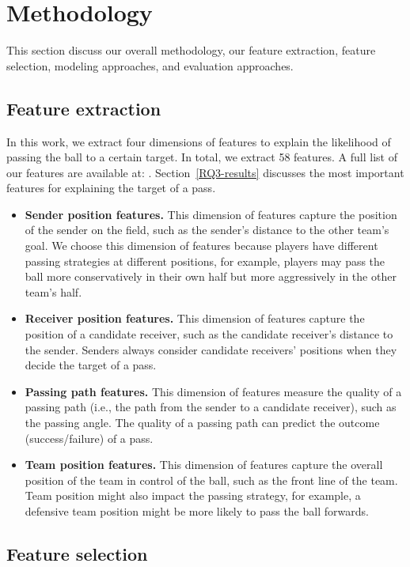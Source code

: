 \section{Methodology} \label{methodology}
This section discuss our overall methodology, our feature extraction, feature selection, modeling approaches, and evaluation approaches.

\subsection{Feature extraction}

In this work, we extract four dimensions of features to explain the likelihood of passing the ball to a certain target. In total, we extract 58 features. A full list of our features are available at: . Section~\ref{RQ3-results} discusses the most important features for explaining the target of a pass.
\begin{itemize}
	\item \textbf{Sender position features.} This dimension of features capture the position of the sender on the field, such as the sender's distance to the other team's goal. We choose this dimension of features because players have different passing strategies at different positions, for example, players may pass the ball more conservatively in their own half but more aggressively in the other team's half.
	\item \textbf{Receiver position features.} This dimension of features capture the position of a candidate receiver, such as the candidate receiver's distance to the sender. Senders always consider candidate receivers' positions when they decide the target of a pass.
	\item \textbf{Passing path features.} This dimension of features measure the quality of a passing path (i.e., the path from the sender to a candidate receiver), such as the passing angle. The quality of a passing path can predict the outcome (success/failure) of a pass.
	\item \textbf{Team position features.} This dimension of features capture the overall position of the team in control of the ball, such as the front line of the team. Team position might also impact the passing strategy, for example, a defensive team position might be more likely to pass the ball forwards.
\end{itemize}

\subsection{Feature selection}

